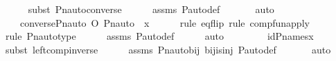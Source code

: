 \begin{isabellebody}
\ \ \ \ \isamarkupfalse%
{\isacharparenleft}{\kern0pt}subst\ Pn{\isacharunderscore}{\kern0pt}auto{\isacharunderscore}{\kern0pt}converse{\isacharparenright}{\kern0pt}\isanewline
\ \ \ \ \isamarkupfalse%
\ assms\ P{\isacharunderscore}{\kern0pt}auto{\isacharunderscore}{\kern0pt}def\ \isanewline
\ \ \ \ \isamarkupfalse%
\ auto\isanewline
\ \ \isamarkupfalse%
\ \isamarkupfalse%
\ {\isachardoublequoteopen}{\isachardot}{\kern0pt}{\isachardot}{\kern0pt}{\isachardot}{\kern0pt}\ {\isacharequal}{\kern0pt}\ {\isacharparenleft}{\kern0pt}converse{\isacharparenleft}{\kern0pt}Pn{\isacharunderscore}{\kern0pt}auto{\isacharparenleft}{\kern0pt}{\isasympi}{\isacharparenright}{\kern0pt}{\isacharparenright}{\kern0pt}\ O\ Pn{\isacharunderscore}{\kern0pt}auto{\isacharparenleft}{\kern0pt}{\isasympi}{\isacharparenright}{\kern0pt}{\isacharparenright}{\kern0pt}\ {\isacharbackquote}{\kern0pt}\ x{\isachardoublequoteclose}\ \isanewline
\ \ \ \ \isamarkupfalse%
{\isacharparenleft}{\kern0pt}rule\ eq{\isacharunderscore}{\kern0pt}flip{\isacharcomma}{\kern0pt}\ rule\ comp{\isacharunderscore}{\kern0pt}fun{\isacharunderscore}{\kern0pt}apply{\isacharparenright}{\kern0pt}\isanewline
\ \ \ \ \ \isamarkupfalse%
{\isacharparenleft}{\kern0pt}rule\ Pn{\isacharunderscore}{\kern0pt}auto{\isacharunderscore}{\kern0pt}type{\isacharparenright}{\kern0pt}\isanewline
\ \ \ \ \isamarkupfalse%
\ assms\ P{\isacharunderscore}{\kern0pt}auto{\isacharunderscore}{\kern0pt}def\isanewline
\ \ \ \ \isamarkupfalse%
\ auto\ \isanewline
\ \ \isamarkupfalse%
\ \isamarkupfalse%
\ {\isachardoublequoteopen}{\isachardot}{\kern0pt}{\isachardot}{\kern0pt}{\isachardot}{\kern0pt}\ {\isacharequal}{\kern0pt}\ id{\isacharparenleft}{\kern0pt}P{\isacharunderscore}{\kern0pt}names{\isacharparenright}{\kern0pt}{\isacharbackquote}{\kern0pt}x{\isachardoublequoteclose}\ \isanewline
\ \ \ \ \isamarkupfalse%
{\isacharparenleft}{\kern0pt}subst\ left{\isacharunderscore}{\kern0pt}comp{\isacharunderscore}{\kern0pt}inverse{\isacharparenright}{\kern0pt}\isanewline
\ \ \ \ \isamarkupfalse%
\ assms\ Pn{\isacharunderscore}{\kern0pt}auto{\isacharunderscore}{\kern0pt}bij\ bij{\isacharunderscore}{\kern0pt}is{\isacharunderscore}{\kern0pt}inj\ P{\isacharunderscore}{\kern0pt}auto{\isacharunderscore}{\kern0pt}def\ \isanewline
\ \ \ \ \isamarkupfalse%
\ auto\isanewline
\ \ \isamarkupfalse%
\ \isamarkupfalse%

\end{isabellebody}
